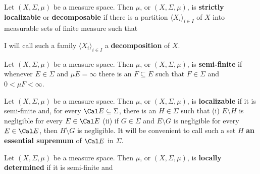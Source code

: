  Let $(X,\Sigma,\mu)$ be a measure space.
Then $\mu$, or $(X,\Sigma,\mu)$, is {\bf strictly localizable} or {\bf
decomposable} if there is a partition
$\langle X_i\rangle_{i\in I}$ of $X$ into measurable sets of finite 
measure such that 
     
     
     
\noindent I will call such a family $\langle X_i\rangle_{i\in I}$ a {\bf
decomposition} of $X$.
     
     
 Let $(X,\Sigma,\mu)$ be a measure space.
Then $\mu$, or $(X,\Sigma,\mu)$, is {\bf semi-finite} if whenever
$E\in\Sigma$ and $\mu E=\infty$ there is an $F\subseteq E$ such that
$F\in\Sigma$ and $0<\mu F<\infty$.
     
 Let $(X,\Sigma,\mu)$ be a measure space.
Then $\mu$, or $(X,\Sigma,\mu)$, is {\bf localizable} if it
is semi-finite and, for every $\Cal E\subseteq\Sigma$, there is an
$H\in\Sigma$ such that (i) $E\setminus H$ is negligible for every
$E\in\Cal E$ (ii) if $G\in\Sigma$ and $E\setminus G$ is negligible for
every $E\in\Cal E$, then $H\setminus G$ is negligible.
It will be
convenient to call such a set $H$  {\bf an essential supremum} of 
$\Cal E$ in $\Sigma$.
     
     
 Let $(X,\Sigma,\mu)$ be a measure space.
Then $\mu$, or $(X,\Sigma,\mu)$, is {\bf locally determined} if it is
semi-finite and
     
